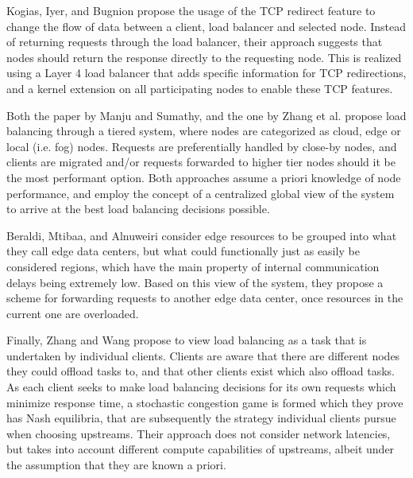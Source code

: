 Kogias, Iyer, and Bugnion propose the usage of the TCP redirect feature to change the flow of data between a client, load balancer and selected node\cite{kogiasBypassingLoadBalancer2020}.
Instead of returning requests through the load balancer, their approach suggests that nodes should return the response directly to the requesting node.
This is realized using a Layer 4 load balancer that adds specific information for TCP redirections, and a kernel extension on all participating nodes to enable these TCP features.

Both the paper by Manju and Sumathy\cite{manjuEfficientLoadBalancing2019}, and the one by Zhang et al. \cite{zhangSecureOptimizedLoad2021} propose load balancing through a tiered system, where nodes are categorized as cloud, edge or local (i.e. fog) nodes.
Requests are preferentially handled by close-by nodes, and clients are migrated and/or requests forwarded to higher tier nodes should it be the most performant option.
Both approaches assume a priori knowledge of node performance, and employ the concept of a centralized global view of the system to arrive at the best load balancing decisions possible.

Beraldi, Mtibaa, and Alnuweiri\cite{beraldiCooperativeLoadBalancing2017} consider edge resources to be grouped into what they call edge data centers, but what could functionally just as easily be considered regions, which have the main property of internal communication delays being extremely low.
Based on this view of the system, they propose a scheme for forwarding requests to another edge data center, once resources in the current one are overloaded.

Finally, Zhang and Wang\cite{zhangStochasticCongestionGame2021} propose to view load balancing as a task that is undertaken by individual clients.
Clients are aware that there are different nodes they could offload tasks to, and that other clients exist which also offload tasks.
As each client seeks to make load balancing decisions for its own requests which minimize response time, a stochastic congestion game is formed\cite{zhangStochasticCongestionGame2021} which they prove has Nash equilibria, that are subsequently the strategy individual clients pursue when choosing upstreams.
Their approach does not consider network latencies, but takes into account different compute capabilities of upstreams, albeit under the assumption that they are known a priori.

